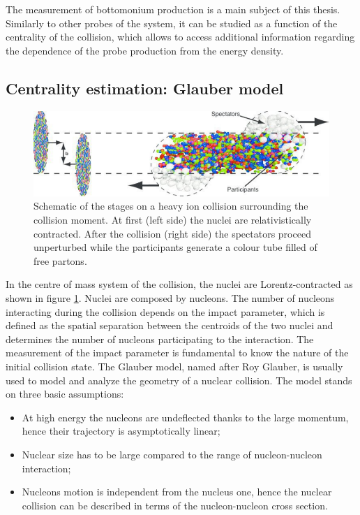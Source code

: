 The measurement of bottomonium production is a main subject of this thesis.
Similarly to other probes of the system, it can be studied as a function of the centrality of the collision, which allows to access additional information regarding the dependence of the probe production from the energy density.

\subsection{Centrality estimation: Glauber model}
\label{intro_glauber}

\begin{figure}[!ht]
\begin{center}
\includegraphics[width=0.99\linewidth]{Chapters/Introduction/Figs/collision.pdf}
\caption{Schematic of the stages on a heavy ion collision surrounding the collision moment. At first (left side) the nuclei are relativistically contracted. After the collision (right side) the spectators proceed unperturbed while the participants generate a colour tube filled of free partons.}
\label{fig:collision}
\end{center}
\end{figure}

In the centre of mass system of the collision, the nuclei are Lorentz-contracted as shown in figure \ref{fig:collision}.
Nuclei are composed by nucleons. The number of nucleons interacting during the collision depends on the impact parameter, which is defined as the spatial separation between the centroids of the two nuclei and determines the number of nucleons participating to the interaction.
The measurement of the impact parameter is fundamental to know the nature of the initial collision state.
The Glauber model, named after Roy Glauber, is usually used to model and analyze the geometry of a nuclear collision.
The model stands on three basic assumptions:
\begin{itemize}
\item At high energy the nucleons are undeflected thanks to the large momentum, hence their trajectory is asymptotically linear;
\item Nuclear size has to be large compared to the range of nucleon-nucleon interaction;
\item Nucleons motion is independent from the nucleus one, hence the nuclear collision can be described in terms of the nucleon-nucleon cross section.
\end{itemize}

